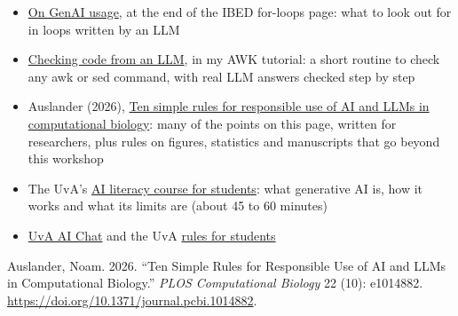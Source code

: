 \documentclass[
  letterpaper,
  DIV=11,
  numbers=noendperiod]{scrreprt}
\newlength{\cslhangindent}
\newenvironment{CSLReferences}[2] %
 {\begin{list}{}{%
  \setlength{\itemindent}{0pt}
  \setlength{\leftmargin}{0pt}
  \setlength{\parsep}{0pt}
  \ifodd #1
   \setlength{\leftmargin}{\cslhangindent}
   \setlength{\itemindent}{-1\cslhangindent}
  \fi
  \setlength{\itemsep}{#2\baselineskip}}}
 {\end{list}}
\providecommand{\tightlist}{%
  \setlength{\itemsep}{0pt}\setlength{\parskip}{0pt}}
\begin{document}
\begin{itemize}
\tightlist
\item
  \href{https://scienceparkstudygroup.github.io/ibed-bioinformatics-page/source/core_tools/bash-for-loops.html}{On
  GenAI usage}, at the end of the IBED for-loops page: what to look out
  for in loops written by an LLM
\item
  \href{https://ndombrowski.github.io/AWK_tutorial/source/check_llm_code.html}{Checking
  code from an LLM}, in my AWK tutorial: a short routine to check any
  awk or sed command, with real LLM answers checked step by step
\item
  Auslander (2026),
  \href{https://doi.org/10.1371/journal.pcbi.1014882}{Ten simple rules
  for responsible use of AI and LLMs in computational biology}: many of
  the points on this page, written for researchers, plus rules on
  figures, statistics and manuscripts that go beyond this workshop
\item
  The UvA's \href{https://edu.nl/gakhm}{AI literacy course for
  students}: what generative AI is, how it works and what its limits are
  (about 45 to 60 minutes)
\item
  \href{https://www.uva.nl/en/about-the-uva/about-the-university/ai/ai-in-education/uva-ai-chat/uva-ai-chat.html}{UvA
  AI Chat} and the UvA
  \href{https://student.uva.nl/en/information/ai-tools-and-your-studies}{rules
  for students}
\end{itemize}

\label{refs}
\begin{CSLReferences}{1}{0}
Auslander, Noam. 2026. {``Ten Simple Rules for Responsible Use of {AI}
and {LLMs} in Computational Biology.''} \emph{PLOS Computational
Biology} 22 (10): e1014882.
\url{https://doi.org/10.1371/journal.pcbi.1014882}.

\end{CSLReferences}
\end{document}
